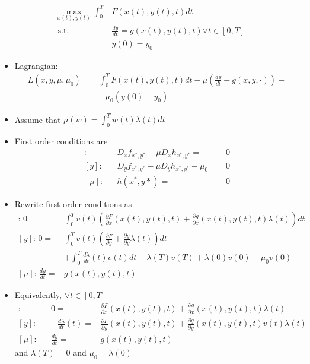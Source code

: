 \documentclass[compress]{beamer}
\begin{document}
\begin{frame}
  \begin{align*}
    \max_{x(t),y(t)} \int_0^T & F(x(t),y(t),t) dt \\
    \text{ s.t.} & \frac{d y}{dt} = g(x(t),y(t),t) \forall t \in [0,T] \\ 
    & y(0) = y_0
  \end{align*}
  \begin{itemize}
  \item Lagrangian: 
    \begin{align*}
      L(x,y,\mu,\mu_0) = & \int_0^T F(x(t),y(t),t) dt  -
      \mu\left(\frac{dy}{dt} - g(x,y,\cdot) \right) -\\ 
      & - \mu_0(y(0) - y_0) 
    \end{align*}
  \item Assume that $\mu(w) = \int_{0}^T w(t) \lambda(t) dt$
  \item First order conditions are
    \begin{align}
      [x]: && D_xf_{x^*,y^*} - \mu D_xh_{x^*,y^*} = & 0 \\
      [y]: && D_yf_{x^*,y^*} - \mu D_yh_{x^*,y^*} - \mu_0 = & 0 \\
      [\mu]: && h(x^*,y*) = & 0 
    \end{align}
  \end{itemize}
\end{frame}

\begin{frame}[shrink]
  \begin{itemize}
  \item Rewrite first order conditions as 
    {\small
    \begin{align*}
      [x]:\, 0 =& \int_0^T v(t) \left(\frac{\partial F}{\partial x}(x(t),y(t),t) +
        \frac{\partial g}{\partial x}(x(t),y(t),t) \lambda(t)\right)
      dt  \\
      [y]:\, 0 = & \int_0^T v(t) \left(\frac{\partial F}{\partial
          y} + \frac{\partial g}{\partial y}
        \lambda(t)  \right)dt  + \\
      & + \int_0^T \frac{d\lambda}{dt}(t)v(t)dt -
      \lambda(T)v(T) + \lambda(0)v(0)  - \mu_0v(0) \\
      [\mu]:\, \frac{dy}{dt} = & g(x(t),y(t),t)  
    \end{align*}    
  }
  \item Equivalently, $\forall t \in [0,T]$
    {\small
    \begin{align*}
      [x]:&& 0 = &\frac{\partial F}{\partial x}(x(t),y(t),t) +
      \frac{\partial g}{\partial x}(x(t),y(t),t) \lambda(t) \\
      [y]:&& -\frac{d\lambda}{dt}(t) = & \frac{\partial F}{\partial
        y}(x(t),y(t),t) + \frac{\partial g}{\partial y}(x(t),y(t),t)
      v(t) \lambda(t) \\
      [\mu]:&& \frac{dy}{dt} = & g(x(t),y(t),t) 
    \end{align*}
    }
    and $\lambda(T) = 0$ and $\mu_0 = \lambda(0)$
  \end{itemize}
\end{frame}
\end{document}
